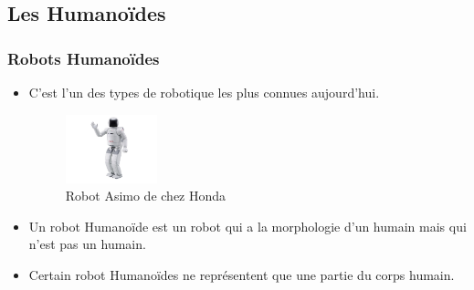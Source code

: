 \documentclass{beamer}
\begin{document}
\subsection{Les Humanoïdes}
\begin{frame}
\frametitle{Robots Humanoïdes}
\begin{itemize}
    \item C'est l'un des types de robotique les plus connues aujourd'hui.
    \begin{figure}
        \centering
        \includegraphics[width=100]{img/asimo.png}
        \caption{Robot Asimo de chez Honda}
        \label{fig:my_label}
    \end{figure}
    \item Un robot Humanoïde est un robot qui a la morphologie d'un humain mais qui n'est pas un humain. 
    \item Certain robot Humanoïdes ne représentent que une partie du corps humain. 
\end{itemize}
\end{frame}
\end{document}
